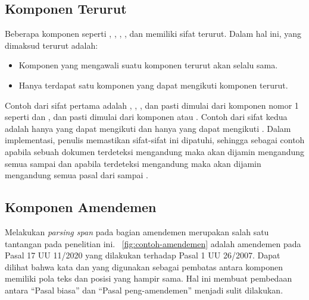 \subsection{Komponen Terurut}
\label{subsec:komponen-terurut}

Beberapa komponen seperti , , , , dan
 memiliki sifat terurut. Dalam hal ini, yang dimaksud terurut adalah:

\begin{itemize}
  \item Komponen yang mengawali suatu komponen terurut akan selalu sama.
  \item Hanya terdapat satu komponen yang dapat mengikuti komponen terurut.
\end{itemize}

Contoh dari sifat pertama adalah , , , dan
 pasti dimulai dari komponen nomor 1 seperti  dan , dan
 pasti dimulai dari komponen  atau . Contoh dari sifat kedua
adalah hanya  yang dapat mengikuti  dan hanya  yang dapat
mengikuti . Dalam implementasi, penulis memastikan sifat-sifat ini dipatuhi, sehingga
sebagai contoh apabila sebuah dokumen terdeteksi mengandung  maka akan dijamin
mengandung semua  sampai  dan apabila terdeteksi mengandung
 maka akan dijamin mengandung semua pasal dari  sampai
.

\subsection{Komponen Amendemen}
\label{subsec:komponen-amendemen}

Melakukan \textit{parsing span} pada bagian amendemen merupakan salah satu tantangan pada penelitian
ini. \pic~\ref{fig:contoh-amendemen} adalah amendemen pada Pasal 17 UU 11/2020 yang dilakukan
terhadap Pasal 1 UU 26/2007. Dapat dilihat bahwa kata  dan  yang
digunakan sebagai pembatas antara komponen memiliki pola teks dan posisi yang hampir sama. Hal ini
membuat pembedaan antara ``Pasal biasa'' dan ``Pasal peng-amendemen'' menjadi sulit dilakukan.

